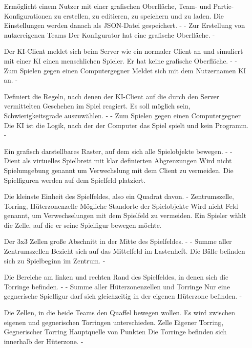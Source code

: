 {Ermöglicht einem Nutzer mit einer grafischen Oberfläche, Team- und Partie-Konfigurationen zu erstellen, zu editieren, zu speichern und zu laden. Die Einstellungen werden danach als JSON-Datei gespeichert.}
{-}
{-}
{Zur Erstellung von nutzereigenen Teams}
{Der Konfigurator hat eine grafische Oberfläche.}
{-}

{Der KI-Client meldet sich beim Server wie ein normaler Client an und simuliert mit einer KI einen menschlichen Spieler. Er hat keine grafische Oberfläche. }
{-}
{-}
{Zum Spielen gegen einen Computergegner}
{Meldet sich mit dem Nutzernamen \glqq{}KI\grqq{} an.}
{-}

{Definiert die Regeln, nach denen der KI-Client auf die durch den Server vermittelten Geschehen im Spiel reagiert. Es soll möglich sein, Schwierigkeitsgrade auszuwählen.}
{-}
{-}
{Zum Spielen gegen einen Computergegner}
{Die KI ist die Logik, nach der der Computer das Spiel spielt und kein Programm.}
{-}

{Ein grafisch darstellbares Raster, auf dem sich alle Spielobjekte bewegen.}
{-}
{-}
{Dient als virtuelles Spielbrett mit klar definierten Abgrenzungen}
{Wird nicht Spielumgebung genannt um Verwechslung mit dem Client zu vermeiden.}
{Die Spielfiguren werden auf dem Spielfeld platziert.}

{Die kleinste Einheit des Spielfeldes, also ein Quadrat davon.}
{-}
{Zentrumszelle, Torring, Hüterzonenzelle}
{Mögliche Standorte der Spielobjekte}
{Wird nicht Feld genannt, um Verwechselungen mit dem Spielfeld zu vermeiden.}
{Ein Spieler wählt die Zelle, auf die er seine Spielfigur bewegen möchte.}

{Der 3x3 Zellen große Abschnitt in der Mitte des Spielfeldes.}
{-}
{-}
{Summe aller Zentrumszellen}
{Bezieht sich auf das Mittelfeld im Lastenheft. Die Bälle befinden sich zu Spielbeginn im Zentrum.}
{-}

{Die Bereiche am linken und rechten Rand des Spielfeldes, in denen sich die Torringe befinden.}
{-}
{-}
{Summe aller Hüterzonenzellen und Torringe}
{Nur eine gegnerische Spielfigur darf sich gleichzeitig in der eigenen Hüterzone befinden.}
{-}

{Die Zellen, in die beide Teams den Quaffel bewegen wollen. Es wird zwischen eigenen und gegnerischen Torringen unterschieden.}
{Zelle}
{Eigener Torring, Gegnerischer Torring}
{Hauptquelle von Punkten}
{Die Torringe befinden sich innerhalb der Hüterzone.}
{-}

